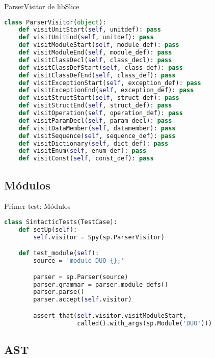 \documentclass[11pt]{beamer}
\begin{document}
\begin{frame}[fragile]{ParserVisitor de libSlice}

\begin{lstlisting}[language=Python]
class ParserVisitor(object):
    def visitUnitStart(self, unitdef): pass
    def visitUnitEnd(self, unitdef): pass
    def visitModuleStart(self, module_def): pass
    def visitModuleEnd(self, module_def): pass
    def visitClassDecl(self, class_decl): pass
    def visitClassDefStart(self, class_def): pass
    def visitClassDefEnd(self, class_def): pass
    def visitExceptionStart(self, exception_def): pass
    def visitExceptionEnd(self, exception_def): pass
    def visitStructStart(self, struct_def): pass
    def visitStructEnd(self, struct_def): pass
    def visitOperation(self, operation_def): pass
    def visitParamDecl(self, param_decl): pass
    def visitDataMember(self, datamember): pass
    def visitSequence(self, sequence_def): pass
    def visitDictionary(self, dict_def): pass
    def visitEnum(self, enum_def): pass
    def visitConst(self, const_def): pass
\end{lstlisting}
\end{frame}


\subsection{Módulos}

\begin{frame}[fragile]{Primer test: Módulos}
\begin{lstlisting}[language=Python]
class SintacticTests(TestCase):
    def setUp(self):
        self.visitor = Spy(sp.ParserVisitor)

    def test_module(self):
        source = 'module DUO {};'

        parser = sp.Parser(source)
        parser.grammar = parser.module_defs()
        parser.parse()
        parser.accept(self.visitor)

        assert_that(self.visitor.visitModuleStart,
                    called().with_args(sp.Module('DUO')))
\end{lstlisting}
\end{frame}

\subsection{AST}
\end{document}
